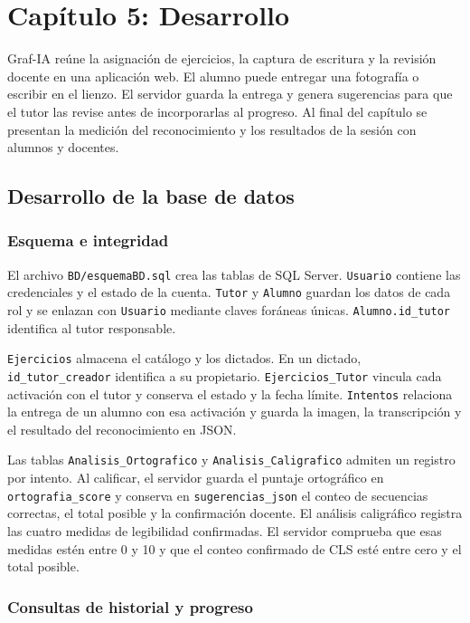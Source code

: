 \section{Capítulo 5: Desarrollo}

Graf-IA reúne la asignación de ejercicios, la captura de escritura y la revisión docente en una aplicación web. El alumno puede entregar una fotografía o escribir en el lienzo. El servidor guarda la entrega y genera sugerencias para que el tutor las revise antes de incorporarlas al progreso. Al final del capítulo se presentan la medición del reconocimiento y los resultados de la sesión con alumnos y docentes.

\subsection{Desarrollo de la base de datos}

\subsubsection{Esquema e integridad}

El archivo \texttt{BD/esquemaBD.sql} crea las tablas de SQL Server. \texttt{Usuario} contiene las credenciales y el estado de la cuenta. \texttt{Tutor} y \texttt{Alumno} guardan los datos de cada rol y se enlazan con \texttt{Usuario} mediante claves foráneas únicas. \texttt{Alumno.id\_tutor} identifica al tutor responsable.

\texttt{Ejercicios} almacena el catálogo y los dictados. En un dictado, \texttt{id\_tutor\_creador} identifica a su propietario. \texttt{Ejercicios\_Tutor} vincula cada activación con el tutor y conserva el estado y la fecha límite. \texttt{Intentos} relaciona la entrega de un alumno con esa activación y guarda la imagen, la transcripción y el resultado del reconocimiento en JSON.

Las tablas \texttt{Analisis\_Ortografico} y \texttt{Analisis\_Caligrafico} admiten un registro por intento. Al calificar, el servidor guarda el puntaje ortográfico en \texttt{ortografia\_score} y conserva en \texttt{sugerencias\_json} el conteo de secuencias correctas, el total posible y la confirmación docente. El análisis caligráfico registra las cuatro medidas de legibilidad confirmadas. El servidor comprueba que esas medidas estén entre 0 y 10 y que el conteo confirmado de CLS esté entre cero y el total posible.

\subsubsection{Consultas de historial y progreso}

